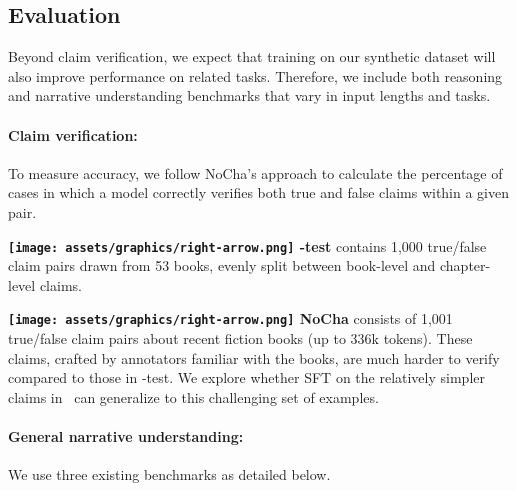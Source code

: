 \subsection{Evaluation}

Beyond claim verification, we expect that training on our synthetic dataset will also improve performance on related tasks. Therefore, we  include both reasoning and narrative understanding benchmarks that vary in input lengths and tasks.

\paragraph{Claim verification:} To measure accuracy, we follow NoCha's approach to calculate the percentage of cases in which a model correctly verifies both true and false claims within a given pair.

\vspace{2pt}
\noindent \textbf{\texttt{[image: assets/graphics/right-arrow.png]} \pipeline-test} contains 1,000 true/false claim pairs drawn from 53 books, evenly split between book-level and chapter-level claims.

\vspace{2pt}
\noindent \textbf{\texttt{[image: assets/graphics/right-arrow.png]} NoCha} \cite{karpinska_one_2024} consists of 1,001 true/false claim pairs about recent fiction books (up to 336k tokens). These claims, crafted by annotators familiar with the books, are much harder to verify compared to those in \pipeline-test. We explore whether SFT on the relatively simpler claims in \pipeline\ can generalize to this challenging set of examples.


\paragraph{General narrative understanding:} We use three existing benchmarks as detailed below.

